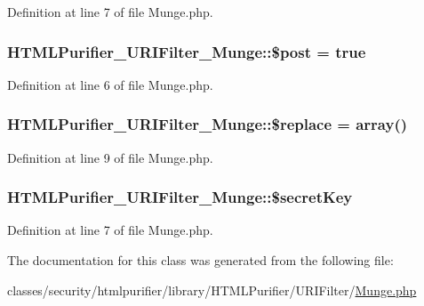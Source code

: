 Definition at line 7 of file Munge.\+php.

\hypertarget{classHTMLPurifier__URIFilter__Munge_a57096486fc926a1cb2af8361999bba9c}{
\subsubsection[{\$post}]{\setlength{\rightskip}{0pt plus 5cm}H\+T\+M\+L\+Purifier\+\_\+\+U\+R\+I\+Filter\+\_\+\+Munge\+::\$post = true}}\label{classHTMLPurifier__URIFilter__Munge_a57096486fc926a1cb2af8361999bba9c}


Definition at line 6 of file Munge.\+php.

\hypertarget{classHTMLPurifier__URIFilter__Munge_ad628754fb7406800b8e7dfa12324d3af}{
\subsubsection[{\$replace}]{\setlength{\rightskip}{0pt plus 5cm}H\+T\+M\+L\+Purifier\+\_\+\+U\+R\+I\+Filter\+\_\+\+Munge\+::\$replace = array()\hspace{0.3cm}{\ttfamily [protected]}}}\label{classHTMLPurifier__URIFilter__Munge_ad628754fb7406800b8e7dfa12324d3af}


Definition at line 9 of file Munge.\+php.

\hypertarget{classHTMLPurifier__URIFilter__Munge_ad8f47e61f8584367c9da43de39144e4e}{
\subsubsection[{\$secret\+Key}]{\setlength{\rightskip}{0pt plus 5cm}H\+T\+M\+L\+Purifier\+\_\+\+U\+R\+I\+Filter\+\_\+\+Munge\+::\$secret\+Key}}\label{classHTMLPurifier__URIFilter__Munge_ad8f47e61f8584367c9da43de39144e4e}


Definition at line 7 of file Munge.\+php.



The documentation for this class was generated from the following file\+:\begin{DoxyCompactItemize}
\item 
classes/security/htmlpurifier/library/\+H\+T\+M\+L\+Purifier/\+U\+R\+I\+Filter/\hyperlink{Munge_8php}{Munge.\+php}\end{DoxyCompactItemize}
